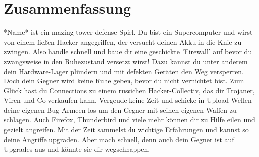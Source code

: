 \section{Zusammenfassung}


*Name* ist ein mazing tower defense Spiel.
Du bist ein Supercomputer und wirst von einem fießen Hacker angegriffen, der versucht deinen Akku in die Knie zu zwingen.
Also handle schnell und baue dir eine geschickte 'Firewall' auf bevor du zwangsweise in den Ruhezustand versetzt wirst!
Dazu kannst du unter anderem dein Hardware-Lager plündern und mit defekten Geräten den Weg versperren.
Doch dein Gegner wird keine Ruhe geben, bevor du nicht vernichtet bist.
Zum Glück hast du Connections zu einem russichen Hacker-Collectiv, das dir Trojaner, Viren und Co verkaufen kann. Vergeude keine Zeit und schicke in Upload-Wellen deine eigenen Bug-Armeen los um den Gegner mit seinen eigenen Waffen zu schlagen.
Auch Firefox, Thunderbird und viele mehr können dir zu Hilfe eilen und gezielt angreifen.
Mit der Zeit sammelst du wichtige Erfahrungen und kannst so deine Angriffe upgraden. Aber mach schnell, denn auch dein Gegner ist auf Upgrades aus und könnte sie dir wegschnappen.
